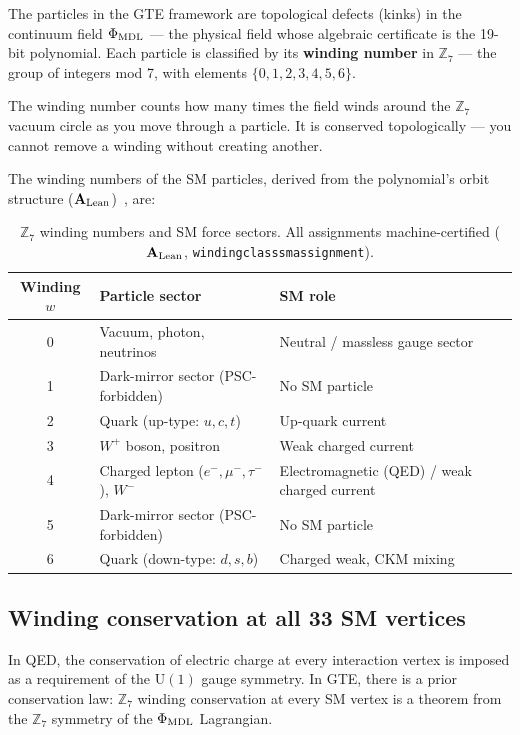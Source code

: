 \documentclass[11pt,a4paper]{article}
\newcommand{\term}[1]{\textbf{#1}}
\newcommand{\lean}[1]{%
  \penalty-100
  \begingroup\def\_{\textunderscore\allowbreak}\texttt{#1}\endgroup}
\newcommand{\CatAL}{\ensuremath{\mathbf{A}_{\rm Lean}}}
\begin{document}
The particles in the GTE framework are topological defects (kinks) in the
continuum field $\Phi_{\rm MDL}$ --- the physical field whose algebraic
certificate is the 19-bit polynomial.
Each particle is classified by its \term{winding number} in $\mathbb{Z}_7$
--- the group of integers mod 7, with elements $\{0, 1, 2, 3, 4, 5, 6\}$.

The winding number counts how many times the field winds around the
$\mathbb{Z}_7$ vacuum circle as you move through a particle.
It is conserved topologically --- you cannot remove a winding without
creating another.

The winding numbers of the SM particles, derived from the polynomial's
orbit structure (\CatAL)~\cite{SpivackGTECompleteFramework}, are:

\begin{table}[h]
\centering
\caption{$\mathbb{Z}_7$ winding numbers and SM force sectors.
All assignments machine-certified (\CatAL, \lean{winding\_class\_sm\_assignment}).}
\label{tab:winding}
\small
\begin{tabular}{cll}
\toprule
Winding $w$ & Particle sector & SM role \\
\midrule
0 & Vacuum, photon, neutrinos & Neutral / massless gauge sector \\
1 & Dark-mirror sector (PSC-forbidden) & No SM particle \\
2 & Quark (up-type: $u,c,t$) & Up-quark current \\
3 & $W^+$ boson, positron & Weak charged current \\
4 & Charged lepton ($e^-,\mu^-,\tau^-$), $W^-$ & Electromagnetic (QED) / weak charged current \\
5 & Dark-mirror sector (PSC-forbidden) & No SM particle \\
6 & Quark (down-type: $d,s,b$) & Charged weak, CKM mixing \\
\bottomrule
\end{tabular}
\end{table}

\subsection{Winding conservation at all 33 SM vertices}

In QED, the conservation of electric charge at every interaction vertex
is imposed as a requirement of the $\mathrm{U}(1)$ gauge symmetry.
In GTE, there is a prior conservation law: $\mathbb{Z}_7$ winding conservation
at every SM vertex is a theorem from the $\mathbb{Z}_7$ symmetry of the
$\Phi_{\rm MDL}$ Lagrangian.
\end{document}
